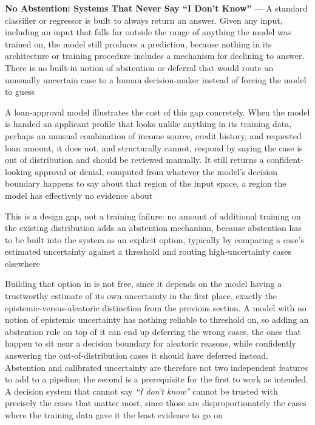 \textbf{No Abstention: Systems That Never Say ``I Don't Know''} --- A standard classifier
or regressor is built to always return an answer. Given any input, including an input
that falls far outside the range of anything the model was trained on, the model
still produces a prediction, because nothing in its architecture or training procedure
includes a mechanism for declining to answer. There is no built-in notion of
abstention or deferral that would route an unusually uncertain case to a human
decision-maker instead of forcing the model to guess

A loan-approval model illustrates the cost of this gap concretely. When the
model is handed an applicant profile that looks unlike anything in its training
data, perhaps an unusual combination of income source, credit history, and requested
loan amount, it does not, and structurally cannot, respond by saying the case is
out of distribution and should be reviewed manually. It still returns a confident-looking
approval or denial, computed from whatever the model's decision boundary happens
to say about that region of the input space, a region the model has effectively no
evidence about

This is a design gap, not a training failure: no amount of additional training
on the existing distribution adds an abstention mechanism, because abstention has
to be built into the system as an explicit option, typically by comparing a case's
estimated uncertainty against a threshold and routing high-uncertainty cases
elsewhere

Building that option in is not free, since it depends on the model having a
trustworthy estimate of its own uncertainty in the first place, exactly the epistemic-versus-aleatoric
distinction from the previous section. A model with no notion of epistemic
uncertainty has nothing reliable to threshold on, so adding an abstention rule on
top of it can end up deferring the wrong cases, the ones that happen to sit near
a decision boundary for aleatoric reasons, while confidently answering the out-of-distribution
cases it should have deferred instead. Abstention and calibrated uncertainty are
therefore not two independent features to add to a pipeline; the second is a prerequisite
for the first to work as intended. A decision system that cannot say \emph{``I
don't know''} cannot be trusted with precisely the cases that matter most, since
those are disproportionately the cases where the training data gave it the least
evidence to go on

